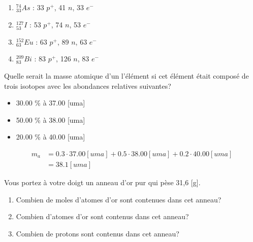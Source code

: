 \documentclass[
  11pt,
  a4paper,
  openany]{book}
\providecommand{\tightlist}{%
  \setlength{\itemsep}{0pt}\setlength{\parskip}{0pt}}
\begin{document}
\begin{Answer}

\begin{enumerate}
\def\labelenumi{\arabic{enumi}.}
\tightlist
\item
  \(^{74}_{33}As\) : 33 \(p^+\), 41 \(n\), 33 \(e^-\)\\
\item
  \(^{127}_{53}I\) : 53 \(p^+\), 74 \(n\), 53 \(e^-\)\\
\item
  \(^{152}_{63}Eu\) : 63 \(p^+\), 89 \(n\), 63 \(e^-\)\\
\item
  \(^{209}_{83}Bi\) : 83 \(p^+\), 126 \(n\), 83 \(e^-\)
\end{enumerate}

\end{Answer}

\begin{Exercise}

Quelle serait la masse atomique d'un l'élément si cet élément était composé de trois isotopes avec les abondances relatives suivantes?

\begin{itemize}
\tightlist
\item
  30.00 \% à 37.00 {[}uma{]}
\item
  50.00 \% à 38.00 {[}uma{]}
\item
  20.00 \% à 40.00 {[}uma{]}
\end{itemize}


\end{Exercise}

\begin{Answer}
\[ \begin{split}
        m_a & = 0.3 \cdot 37.00 [uma] + 0.5 \cdot 38.00 [uma] + 0.2 \cdot 40.00 [uma]\\
        &= 38.1 [uma]
\end{split} \]

\end{Answer}

\begin{Exercise}

Vous portez à votre doigt un anneau d'or pur qui pèse 31,6 {[}g{]}.

\begin{enumerate}
\def\labelenumi{\arabic{enumi}.}
\tightlist
\item
  Combien de moles d'atomes d'or sont contenues dans cet anneau?\\
\item
  Combien d'atomes d'or sont contenus dans cet anneau?\\
\item
  Combien de protons sont contenus dans cet anneau?\\
\end{enumerate}

\end{Exercise}
\end{document}
